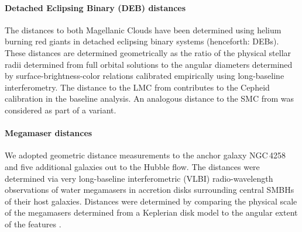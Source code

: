 \paragraph{\textbf{Detached Eclipsing Binary (DEB) distances}} %
The distances to both Magellanic Clouds have been determined using helium burning red giants in detached eclipsing binary systems (henceforth: DEBs). These distances are determined geometrically as the ratio of the physical stellar radii determined from full orbital solutions to the angular diameters determined by surface-brightness-color relations calibrated empirically using long-baseline interferometry. 
The distance to the LMC from \cite{2019Natur.567..200P} contributes to the Cepheid calibration in the baseline analysis. An analogous distance to the SMC from \cite{2020ApJ...904...13G} was considered as part of a variant. 


\paragraph{\textbf{Megamaser distances}}
We adopted geometric distance measurements to the anchor galaxy NGC$\,$4258 and five additional galaxies out to the Hubble flow. The distances were determined via very long-baseline interferometric (VLBI) radio-wavelength observations of water megamasers in accretion disks surrounding central SMBHs of their host galaxies. Distances were determined by comparing the physical scale of the megamasers determined from a Keplerian disk model to the angular extent of the features \citep{2015IAUGA..2255730B,2019ApJ...886L..27R,2020ApJ...892...18K}. 

